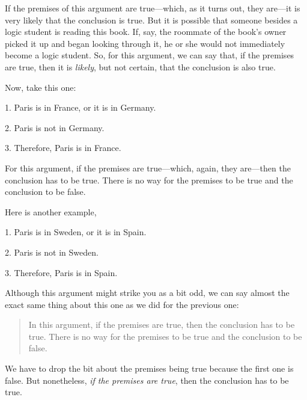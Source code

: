 \noindent If the premises of this argument are true---which, as it turns out, they are---it is very likely that the conclusion is true. But it is possible that someone besides a logic student is reading this book. If, say, the roommate of the book's owner picked it up and began looking through it, he or she would not immediately become a logic student. So, for this argument, we can say that, if the premises are true, then it is \textit{likely}, but not certain, that the conclusion is also true. 

Now, take this one:
	\begin{earg}\label{valid-bananas}
		\item[1.] Paris is in France, or it is in Germany.
		\item[2.] Paris is not in Germany.
		\item[3.] Therefore, Paris is in France.
	\end{earg}
For this argument, if the premises are true---which, again, they are---then the conclusion has to be true. There is no way for the premises to be true and the conclusion to be false. 

Here is another example,
	\begin{earg}
		\item[1.] Paris is in Sweden, or it is in Spain.
		\item[2.] Paris is not in Sweden. 
		\item[3.] Therefore, Paris is in Spain.
	\end{earg}
Although this argument might strike you as a bit odd, we can say almost the exact same thing about this one as we did for the previous one:
\begin{quote}
In this argument, if the premises are true, then the conclusion has to be true. There is no way for the premises to be true and the conclusion to be false. 
\end{quote}
We have to drop the bit about the premises being true because the first one is false. But nonetheless, \textit{if the premises are true}, then the conclusion has to be true. 

